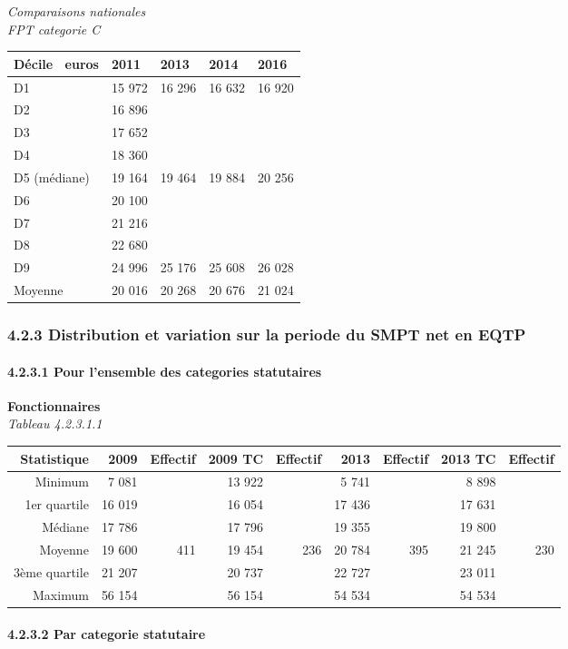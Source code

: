 \emph{Comparaisons nationales}\\
\emph{FPT categorie C}

\begin{longtable}[]{@{}lllll@{}}
\toprule
Décile ~euros & 2011 & 2013 & 2014 & 2016\tabularnewline
\midrule
\endhead
D1 & 15 972 & 16 296 & 16 632 & 16 920\tabularnewline
D2 & 16 896 & & &\tabularnewline
D3 & 17 652 & & &\tabularnewline
D4 & 18 360 & & &\tabularnewline
D5 (médiane) & 19 164 & 19 464 & 19 884 & 20 256\tabularnewline
D6 & 20 100 & & &\tabularnewline
D7 & 21 216 & & &\tabularnewline
D8 & 22 680 & & &\tabularnewline
D9 & 24 996 & 25 176 & 25 608 & 26 028\tabularnewline
Moyenne & 20 016 & 20 268 & 20 676 & 21 024\tabularnewline
\bottomrule
\end{longtable}

\hypertarget{distribution-et-variation-sur-la-periode-du-smpt-net-en-eqtp}{%
\subsubsection{4.2.3 Distribution et variation sur la periode du SMPT
net en
EQTP}\label{distribution-et-variation-sur-la-periode-du-smpt-net-en-eqtp}}

\hypertarget{pour-lensemble-des-categories-statutaires}{%
\paragraph{4.2.3.1 Pour l'ensemble des categories
statutaires}\label{pour-lensemble-des-categories-statutaires}}

\textbf{Fonctionnaires}\\
\hspace*{0.333em}\emph{Tableau 4.2.3.1.1}

\begin{longtable}[]{@{}rrrrrrrrr@{}}
\toprule
Statistique & 2009 & Effectif & 2009 TC & Effectif & 2013 & Effectif &
2013 TC & Effectif\tabularnewline
\midrule
\endhead
Minimum & 7 081 & & 13 922 & & 5 741 & & 8 898 &\tabularnewline
1er quartile & 16 019 & & 16 054 & & 17 436 & & 17 631 &\tabularnewline
Médiane & 17 786 & & 17 796 & & 19 355 & & 19 800 &\tabularnewline
Moyenne & 19 600 & 411 & 19 454 & 236 & 20 784 & 395 & 21 245 &
230\tabularnewline
3ème quartile & 21 207 & & 20 737 & & 22 727 & & 23 011 &\tabularnewline
Maximum & 56 154 & & 56 154 & & 54 534 & & 54 534 &\tabularnewline
\bottomrule
\end{longtable}

\hypertarget{par-categorie-statutaire-1}{%
\paragraph{4.2.3.2 Par categorie
statutaire}\label{par-categorie-statutaire-1}}

